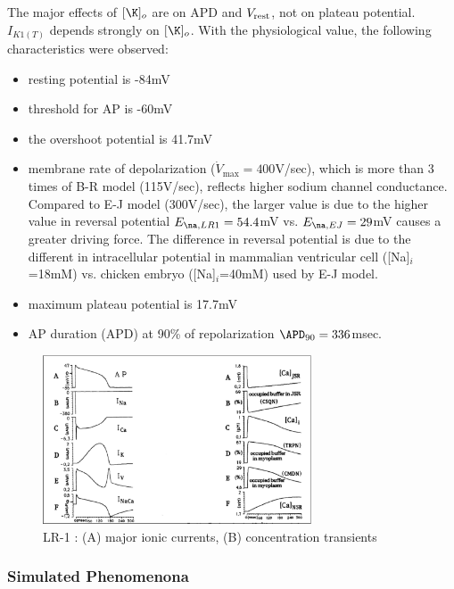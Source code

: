 The major effects of $[\K]_o$ are on APD and $V_{\text{rest}}$, not on plateau
potential. $I_{K1(T)}$ depends strongly on $[\K]_o$. With the physiological
value, the following characteristics were observed:
\begin{itemize}
\item resting potential is -84mV

\item threshold for AP is -60mV

\item the overshoot potential is 41.7mV

\item membrane rate of depolarization ($\dot{V}_\max=400$V/sec), which
  is more than 3 times of B-R model (115V/sec), reflects higher
  sodium channel conductance. Compared to E-J model (300V/sec), the
  larger value is due to the higher value in reversal potential
  $E_{\na,LR1}=54.4$mV vs. $E_{\na,EJ}=29$mV causes a greater driving
  force. The difference in reversal potential is due to the different
  in intracellular potential in mammalian ventricular cell
  ([Na]$_i$=18mM) vs. chicken embryo ([Na]$_i$=40mM) used by E-J
  model.

\item maximum plateau potential is 17.7mV

\item AP duration (APD) at 90\% of repolarization $\APD_{90}=336$msec.
\end{itemize}

\begin{figure}[hbt]
  \centerline{\includegraphics[height=5cm,
    angle=0]{./images/LR1_transient.eps}}
\caption{LR-1 : (A) major ionic currents, (B) concentration transients}
\label{fig:LR1_transient}
\end{figure}

\subsubsection{Simulated Phenomenona}

